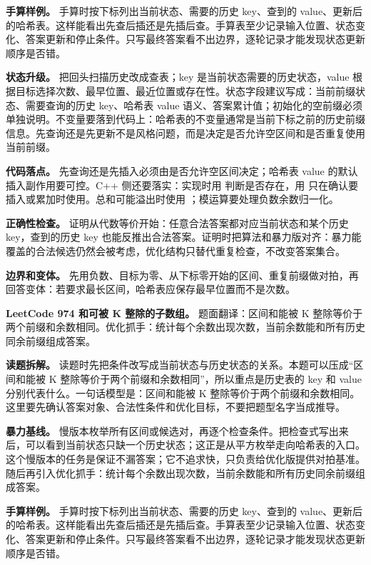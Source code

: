 \textbf{手算样例。} 手算时按下标列出当前状态、需要的历史 key、查到的 value、更新后的哈希表。这样能看出先查后插还是先插后查。手算表至少记录输入位置、状态变化、答案更新和停止条件。只写最终答案看不出边界，逐轮记录才能发现状态更新顺序是否错。

\textbf{状态升级。} 把回头扫描历史改成查表；key 是当前状态需要的历史状态，value 根据目标选择次数、最早位置、最近位置或存在性。状态字段建议写成：当前前缀状态、需要查询的历史 key、哈希表 value 语义、答案累计值；初始化的空前缀必须单独说明。不变量要落到代码上：哈希表的不变量通常是当前下标之前的历史前缀信息。先查询还是先更新不是风格问题，而是决定是否允许空区间和是否重复使用当前前缀。

\textbf{代码落点。} 先查询还是先插入必须由是否允许空区间决定；哈希表 value 的默认插入副作用要可控。C++ 侧还要落实：实现时用  判断是否存在，用  只在确认要插入或累加时使用。总和可能溢出时使用 ；模运算要处理负数余数归一化。

\textbf{正确性检查。} 证明从代数等价开始：任意合法答案都对应当前状态和某个历史 key，查到的历史 key 也能反推出合法答案。证明时把算法和暴力版对齐：暴力能覆盖的合法候选仍然会被考虑，优化结构只替代重复检查，不改变答案集合。

\textbf{边界和变体。} 先用负数、目标为零、从下标零开始的区间、重复前缀做对拍，再回答变体：若要求最长区间，哈希表应保存最早位置而不是次数。

\noindent\textbf{LeetCode 974 和可被 K 整除的子数组。} 题面翻译：区间和能被 K 整除等价于两个前缀和余数相同。优化抓手：统计每个余数出现次数，当前余数能和所有历史同余前缀组成答案。

\textbf{读题拆解。} 读题时先把条件改写成当前状态与历史状态的关系。本题可以压成“区间和能被 K 整除等价于两个前缀和余数相同”，所以重点是历史表的 key 和 value 分别代表什么。一句话模型是：区间和能被 K 整除等价于两个前缀和余数相同。这里要先确认答案对象、合法性条件和优化目标，不要把题型名字当成推导。

\textbf{暴力基线。} 慢版本枚举所有区间或候选对，再逐个检查条件。把检查式写出来后，可以看到当前状态只缺一个历史状态；这正是从平方枚举走向哈希表的入口。这个慢版本的任务是保证不漏答案；它不追求快，只负责给优化版提供对拍基准。随后再引入优化抓手：统计每个余数出现次数，当前余数能和所有历史同余前缀组成答案。

\textbf{手算样例。} 手算时按下标列出当前状态、需要的历史 key、查到的 value、更新后的哈希表。这样能看出先查后插还是先插后查。手算表至少记录输入位置、状态变化、答案更新和停止条件。只写最终答案看不出边界，逐轮记录才能发现状态更新顺序是否错。

